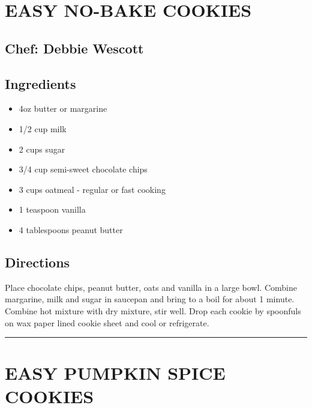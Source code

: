 \documentclass[
]{book}
\providecommand{\tightlist}{%
  \setlength{\itemsep}{0pt}\setlength{\parskip}{0pt}}
\begin{document}
\hypertarget{easy-no-bake-cookies}{%
\section*{EASY NO-BAKE COOKIES}\label{easy-no-bake-cookies}}


\hypertarget{chef-debbie-wescott-5}{%
\subsection*{Chef: Debbie Wescott}\label{chef-debbie-wescott-5}}


\hypertarget{ingredients-95}{%
\subsection*{Ingredients}\label{ingredients-95}}


\begin{itemize}
\tightlist
\item
  4oz butter or margarine
\item
  1/2 cup milk
\item
  2 cups sugar
\item
  3/4 cup semi-sweet chocolate chips
\item
  3 cups oatmeal - regular or fast cooking
\item
  1 teaspoon vanilla
\item
  4 tablespoons peanut butter
\end{itemize}

\hypertarget{directions-95}{%
\subsection*{Directions}\label{directions-95}}


Place chocolate chips, peanut butter, oats and vanilla in a large bowl. Combine margarine, milk and sugar in saucepan and bring to a boil for about 1 minute. Combine hot mixture with dry mixture, stir well. Drop each cookie by spoonfuls on wax paper lined cookie sheet and cool or refrigerate.

\begin{center}\rule{0.5\linewidth}{0.5pt}\end{center}

\hypertarget{easy-pumpkin-spice-cookies}{%
\section*{EASY PUMPKIN SPICE COOKIES}\label{easy-pumpkin-spice-cookies}}
\end{document}
